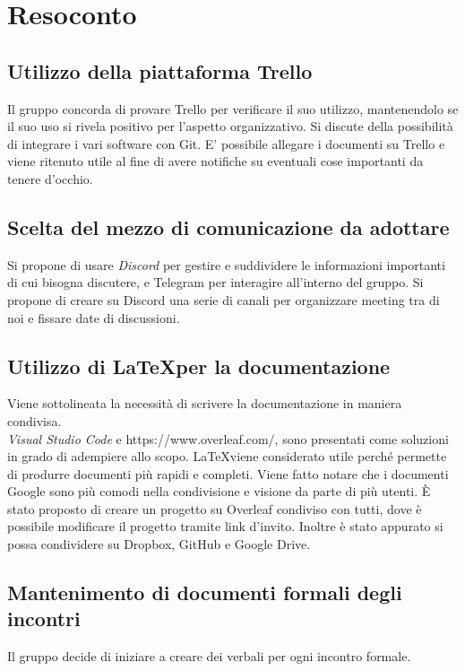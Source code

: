 \documentclass{article}
\begin{document}
\section{Resoconto}%
\label{sec:resoconto}

\subsection{Utilizzo della piattaforma Trello}%
\label{sub:piattaforma_trello}
Il gruppo concorda di provare Trello per verificare il suo utilizzo, mantenendolo se il suo uso si rivela positivo per l’aspetto organizzativo. Si discute della possibilità di integrare i vari software con Git. E’ possibile allegare i documenti su Trello e viene ritenuto utile al fine di avere notifiche su eventuali cose importanti da tenere d’occhio.


\subsection{Scelta del mezzo di comunicazione da adottare}%
\label{sub:mezzo_comunicazione}
Si propone di usare \emph{Discord} per gestire e suddividere le informazioni importanti di cui bisogna discutere, e Telegram per interagire all’interno del gruppo. Si propone di creare su Discord una serie di canali per organizzare meeting tra di noi e fissare date di discussioni.

\subsection{Utilizzo di \LaTeX per la documentazione}%
\label{sub:latex}
Viene sottolineata la necessità di scrivere la documentazione in maniera condivisa. \\
\emph{Visual Studio Code} e https://www.overleaf.com/, sono presentati come soluzioni in grado di adempiere allo scopo. \LaTeX viene considerato utile perché permette di produrre documenti più rapidi e completi. Viene fatto notare che i documenti Google sono più comodi nella condivisione e visione da parte di più utenti. È stato proposto di creare un progetto su Overleaf condiviso con tutti, dove è possibile modificare il progetto tramite link d’invito. Inoltre è stato appurato si possa condividere su Dropbox, GitHub e Google Drive.


\subsection{Mantenimento di documenti formali degli incontri}%
\label{sub:documenti_formali}%
Il gruppo decide di iniziare a creare dei verbali per ogni incontro formale.
\end{document}
